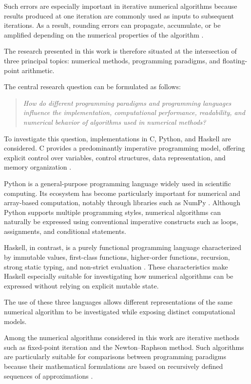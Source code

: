 Such errors are especially important in iterative numerical algorithms because
results produced at one iteration are commonly used as inputs to subsequent
iterations. As a result, rounding errors can propagate, accumulate, or be
amplified depending on the numerical properties of the algorithm
\cite{higham2002accuracy}.

The research presented in this work is therefore situated at the intersection
of three principal topics: numerical methods, programming paradigms, and
floating-point arithmetic.

The central research question can be formulated as follows:

\begin{quote}
\textit{How do different programming paradigms and programming languages
influence the implementation, computational performance, readability, and
numerical behavior of algorithms used in numerical methods?}
\end{quote}

To investigate this question, implementations in C, Python, and Haskell are
considered. C provides a predominantly imperative programming model, offering
explicit control over variables, control structures, data representation, and
memory organization \cite{kernighan1988c}.

Python is a general-purpose programming language widely used in scientific
computing. Its ecosystem has become particularly important for numerical and
array-based computation, notably through libraries such as NumPy
\cite{harris2020array}. Although Python supports multiple programming styles,
numerical algorithms can naturally be expressed using conventional imperative
constructs such as loops, assignments, and conditional statements.

Haskell, in contrast, is a purely functional programming language characterized
by immutable values, first-class functions, higher-order functions, recursion,
strong static typing, and non-strict evaluation
\cite{marlow2010haskell,hutton2016programming}. These characteristics make
Haskell especially suitable for investigating how numerical algorithms can be
expressed without relying on explicit mutable state.

The use of these three languages allows different representations of the same
numerical algorithm to be investigated while exposing distinct computational
models.

Among the numerical algorithms considered in this work are iterative methods
such as fixed-point iteration and the Newton--Raphson method. Such algorithms
are particularly suitable for comparisons between programming paradigms
because their mathematical formulations are based on recursively defined
sequences of approximations
\cite{burden2016numerical,chapra2021numerical}.

